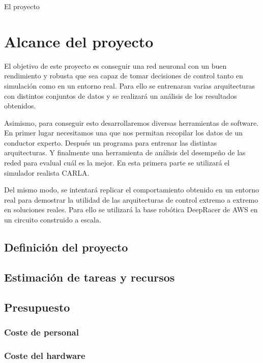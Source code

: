 \documentclass[12pt,a4paper,onecolumn,oneside]{report}
\begin{document}
El proyecto 


\section{Alcance del proyecto}
\label{Alcance del proyecto}

El objetivo de este proyecto es conseguir una red neuronal con un buen rendimiento y robusta que sea capaz de tomar decisiones de control tanto en simulación como en un entorno real. Para ello se entrenaran varias arquitecturas con distintos conjuntos de datos y se realizará un análisis de los resultados obtenidos.

Asimismo, para conseguir esto desarrollaremos diversas herramientas de software. En primer lugar  necesitamos una que nos permitan recopilar los datos de un conductor experto. Después un programa para entrenar las distintas arquitecturas. Y finalmente una herramienta de análisis del desempeño de las reded para evalual cuál es la mejor. En esta primera parte se utilizará el simulador realista CARLA.

Del mismo modo, se intentará replicar el comportamiento obtenido en un entorno real para demostrar la utilidad de las arquitecturas de control extremo a extremo en soluciones reales. Para ello se utilizará la base robótica DeepRacer de AWS en un circuito construido a escala.

\subsection{Definición del proyecto}



\subsection{Estimación de tareas y recursos}



\subsection{Presupuesto}


\subsubsection{Coste de personal}


\subsubsection{Coste del hardware}
\end{document}
